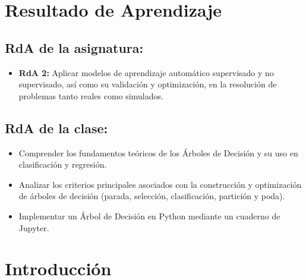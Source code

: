 \documentclass[a4,11pt]{aleph-notas}
\begin{document}
\encabezado


\section*{Resultado de Aprendizaje}

\subsection*{RdA de la asignatura:}
\begin{itemize}[leftmargin=*]
    \item \textbf{RdA 2:} 
    Aplicar modelos de aprendizaje automático supervisado y no supervisado, así como su validación y optimización, en la resolución de problemas tanto reales como simulados.
\end{itemize}

\subsection*{RdA de la clase:}
\begin{itemize}[leftmargin=*]
    \item Comprender los fundamentos teóricos de los Árboles de Decisión y su uso en clasificación y regresión.
    \item Analizar los criterios principales asociados con la construcción y optimización de árboles de decisión (parada, selección, clasificación, partición y poda).
    \item Implementar un Árbol de Decisión en Python mediante un cuaderno de Jupyter.
\end{itemize}

\section*{Introducción}
\end{document}
